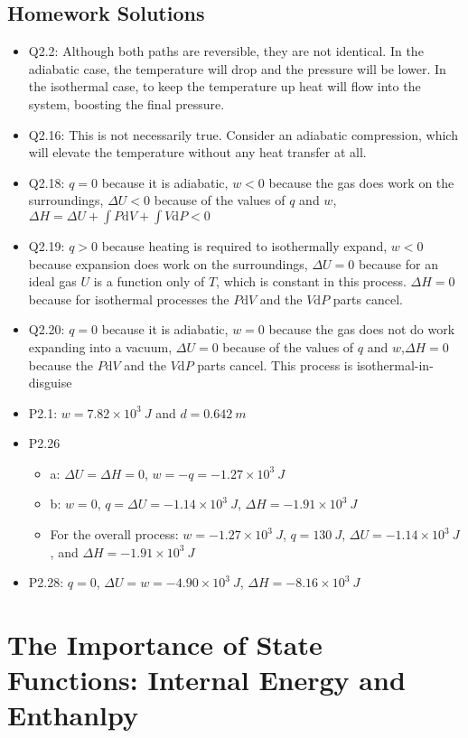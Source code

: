 \documentclass[12pt, openany, letterpaper]{memoir}
\begin{document}
\section*{Homework Solutions}
\begin{itemize}
	\item Q2.2: Although both paths are reversible, they are not identical. In the adiabatic case, the temperature will drop and the pressure will be lower. In the isothermal case, to keep the temperature up heat will flow into the system, boosting the final pressure.
	\item Q2.16: This is not necessarily true. Consider an adiabatic compression, which will elevate the temperature without any heat transfer at all.
	\item Q2.18: $q=0$ because it is adiabatic, $w<0$ because the gas does work on the surroundings, $\Delta U<0$ because of the values of $q$ and $w$, $\Delta H = \Delta U + \int P\mathrm{d}V + \int V\mathrm{d}P < 0$
	\item Q2.19: $q>0$ because heating is required to isothermally expand, $w<0$ because expansion does work on the surroundings, $\Delta U = 0$ because for an ideal gas $U$ is a function only of $T$, which is constant in this process. $\Delta H = 0$ because for isothermal processes the $P\mathrm{d}V$ and the $V\mathrm{d}P$ parts cancel.
	\item Q2.20: $q=0$ because it is adiabatic, $w=0$ because the gas does not do work expanding into a vacuum, $\Delta U=0$ because of the values of $q$ and $w$,$\Delta H = 0$ because the $P\mathrm{d}V$ and the $V\mathrm{d}P$ parts cancel. This process is isothermal-in-disguise
	\item P2.1: $w=7.82\times10^{3}~J$ and $d=0.642~m$
	\item P2.26
	\begin{itemize}
		\item a: $\Delta U = \Delta H = 0$, $w=-q=-1.27\times10^3~J$
		\item b: $w=0$, $q=\Delta U=-1.14\times10^3~J$, $\Delta H=-1.91\times10^3~J$
		\item For the overall process: $w=-1.27\times10^3~J$, $q=130~J$, $\Delta U=-1.14\times10^3~J$, and $\Delta H=-1.91\times10^3~J$
	\end{itemize}
	\item P2.28: $q=0$, $\Delta U=w=-4.90\times10^3~J$, $\Delta H=-8.16\times10^3~J$
\end{itemize}
\chapter{The Importance of State Functions: Internal Energy and Enthanlpy}
\end{document}
